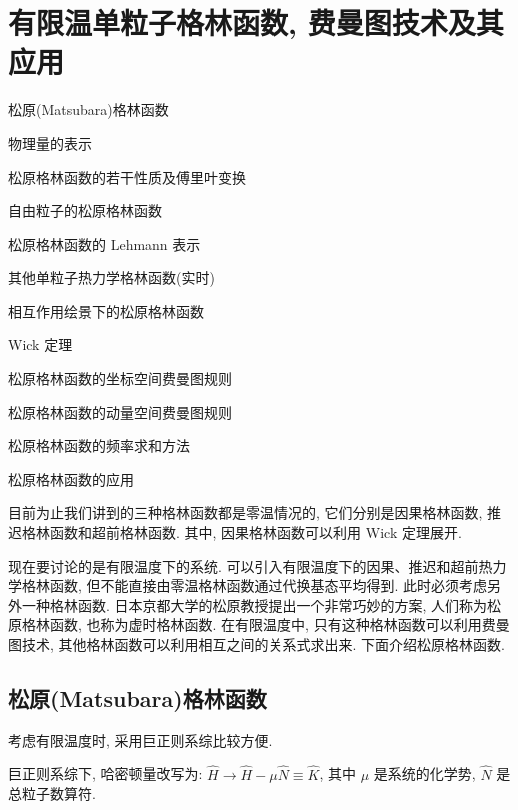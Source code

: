 \setcounter{chapter}{3}
\chapter{有限温单粒子格林函数, 费曼图技术及其应用}
\begin{introduction}
\item 松原(Matsubara)格林函数
\item 物理量的表示
\item 松原格林函数的若干性质及傅里叶变换
\item 自由粒子的松原格林函数
\item 松原格林函数的 Lehmann 表示
\item 其他单粒子热力学格林函数(实时)
\item 相互作用绘景下的松原格林函数
\item Wick 定理
\item 松原格林函数的坐标空间费曼图规则
\item 松原格林函数的动量空间费曼图规则
\item 松原格林函数的频率求和方法
\item 松原格林函数的应用
\end{introduction}
目前为止我们讲到的三种格林函数都是零温情况的, 它们分别是因果格林函数, 推迟格林函数和超前格林函数. 其中, 因果格林函数可以利用 Wick 定理展开. 

现在要讨论的是有限温度下的系统. 可以引入有限温度下的因果、推迟和超前热力学格林函数, 但不能直接由零温格林函数通过代换基态平均得到. 此时必须考虑另外一种格林函数. 日本京都大学的松原教授提出一个非常巧妙的方案, 人们称为松原格林函数, 也称为虚时格林函数. 在有限温度中, 只有这种格林函数可以利用费曼图技术, 其他格林函数可以利用相互之间的关系式求出来. 下面介绍松原格林函数.
\section{松原(Matsubara)格林函数}
考虑有限温度时, 采用巨正则系综比较方便. 

巨正则系综下, 哈密顿量改写为: $\hat{H}\to \hat{H}-\mu\hat{N}\equiv \hat{K}$, 其中 $\mu$ 是系统的化学势, $\hat{N}$ 是总粒子数算符.

